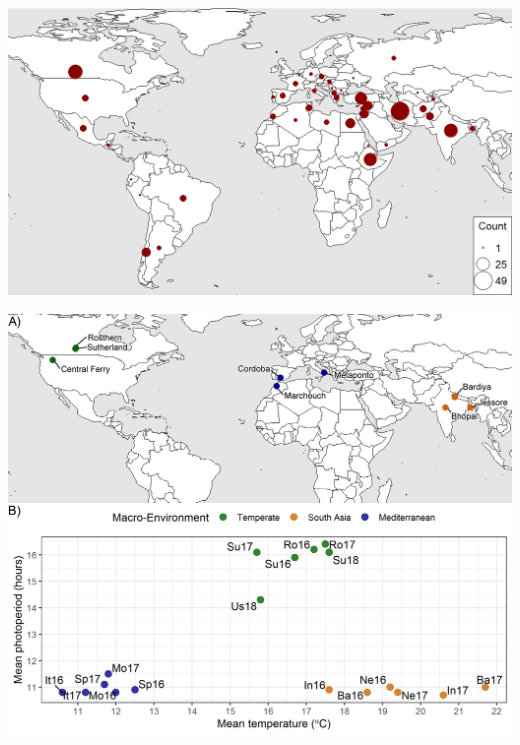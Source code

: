 \documentclass[
]{article}
\begin{document}
\includegraphics[width=1\linewidth]{Phenology_Vignette_files/figure-latex/unnamed-chunk-6-1}

\includegraphics{Figure_01_FieldTrialInfo.png}
\end{document}
